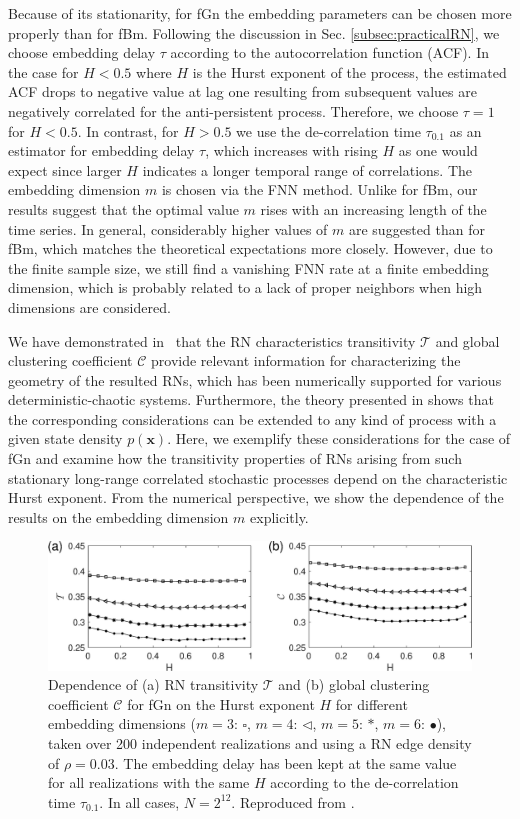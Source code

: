 		Because of its stationarity, for fGn the embedding parameters can be chosen more properly than for fBm. Following the discussion in Sec. \ref{subsec:practicalRN}, we choose embedding delay $\tau$ according to the autocorrelation function (ACF). In the case for $H < 0.5$ where $H$ is the Hurst exponent of the process, the estimated ACF drops to negative value at lag one resulting from subsequent values are negatively correlated for the anti-persistent process. Therefore, we choose $\tau = 1$ for $H < 0.5$. In contrast, for $H > 0.5$ we use the de-correlation time $\tau_{0.1}$ as an estimator for embedding delay $\tau$, which increases with rising $H$ as one would expect since larger $H$ indicates a longer temporal range of correlations. The embedding dimension $m$ is chosen via the FNN method. Unlike for fBm, our results suggest that the optimal value $m$ rises with an increasing length of the time series. In general, considerably higher values of $m$ are suggested than for fBm, which matches the theoretical expectations more closely. However, due to the finite sample size, we still find a vanishing FNN rate at a finite embedding dimension, which is probably related to a lack of proper neighbors when high dimensions are considered. 
				
		We have demonstrated in~\cite{Donner2011b} that the RN characteristics transitivity $\mathcal{T}$ and global clustering coefficient $\mathcal{C}$ provide relevant information for characterizing the geometry of the resulted RNs, which has been numerically supported for various deterministic-chaotic systems. Furthermore, the theory presented in \cite{Donges2012} shows that the corresponding considerations can be extended to any kind of process with a given state density $p(\mathbf{x})$. Here, we exemplify these considerations for the case of fGn and examine how the transitivity properties of RNs arising from such stationary long-range correlated stochastic processes depend on the characteristic Hurst exponent. From the numerical perspective, we show the dependence of the results on the embedding dimension $m$ explicitly. 
		\begin{figure}	
			\centering
			\includegraphics[width=\columnwidth]{Chapter07_Applications/netRec4DimiHP.eps}
		\caption{Dependence of (a) RN transitivity $\mathcal{T}$ and (b) global clustering coefficient $\mathcal{C}$ for fGn on the Hurst exponent $H$ for different embedding dimensions ($m=3$: $\square$, $m=4$: $\triangleleft$, $m=5$: $\ast$, $m=6$: $\bullet$), taken over 200 independent realizations and using a RN edge density of $\rho=0.03$. The embedding delay has been kept at the same value for all realizations with the same $H$ according to the de-correlation time $\tau_{0.1}$. In all cases, $N=2^{12}$. Reproduced from \cite{Zou2015}.  \label{fig:fgn_trans_H}}
\end{figure}
	
